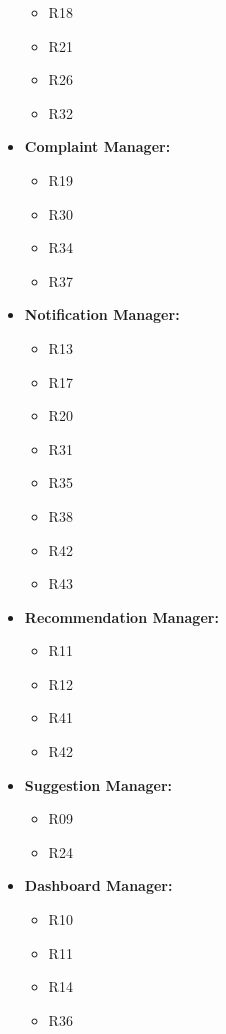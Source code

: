 \begin{itemize}
\begin{itemize}
            \item R18
            \item R21
            \item R26
            \item R32
        \end{itemize}
    \item \textbf{Complaint Manager:}
        \begin{itemize}
            \item R19
            \item R30
            \item R34
            \item R37
        \end{itemize}
    \item \textbf{Notification Manager:}
        \begin{itemize}
            \item R13
            \item R17
            \item R20
            \item R31
            \item R35
            \item R38
            \item R42
            \item R43
        \end{itemize}
    \item \textbf{Recommendation Manager:}
        \begin{itemize}
            \item R11
            \item R12
            \item R41
            \item R42
        \end{itemize}
    \item \textbf{Suggestion Manager:}
        \begin{itemize}
            \item R09
            \item R24
        \end{itemize}
    \item \textbf{Dashboard Manager:}
        \begin{itemize}
            \item R10
            \item R11
            \item R14
            \item R36

\end{itemize}
\end{itemize}
